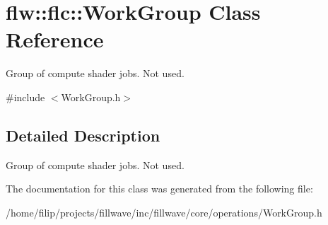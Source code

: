 \hypertarget{classflw_1_1flc_1_1WorkGroup}{}\section{flw\+:\+:flc\+:\+:Work\+Group Class Reference}
\label{classflw_1_1flc_1_1WorkGroup}


Group of compute shader jobs. Not used.  




{\ttfamily \#include $<$Work\+Group.\+h$>$}



\subsection{Detailed Description}
Group of compute shader jobs. Not used. 

The documentation for this class was generated from the following file\+:\begin{DoxyCompactItemize}
\item 
/home/filip/projects/fillwave/inc/fillwave/core/operations/Work\+Group.\+h\end{DoxyCompactItemize}
